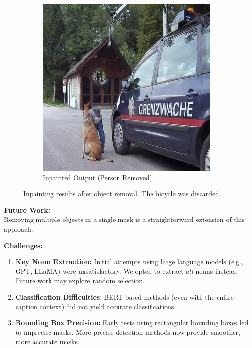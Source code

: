 \documentclass[11pt,letterpaper]{article}
\begin{document}
\begin{figure}[h]
\begin{subfigure}[b]{0.2\textwidth}
        \includegraphics[width=\textwidth]{midterm_report/assets/output_person (1).png}
        \caption{Inpainted Output (Person Removed)}
        \label{fig:inpaint_person}
    \end{subfigure}
    \caption{Inpainting results after object removal. The bicycle was discarded.}
    \label{fig:inpaint_comparison}
\end{figure}

\noindent
\textbf{Future Work:} \\
Removing multiple objects in a single mask is a straightforward extension of this approach.

\noindent
\textbf{Challenges:}
\begin{enumerate}
    \item \textbf{Key Noun Extraction:} Initial attempts using large language models (e.g., GPT, LLaMA) were unsatisfactory. We opted to extract \emph{all} nouns instead. Future work may explore random selection.
    \item \textbf{Classification Difficulties:} BERT-based methods (even with the entire-caption context) did not yield accurate classifications.
    \item \textbf{Bounding Box Precision:} Early tests using rectangular bounding boxes led to imprecise masks. More precise detection methods now provide smoother, more accurate masks.
\end{enumerate}
\end{document}

